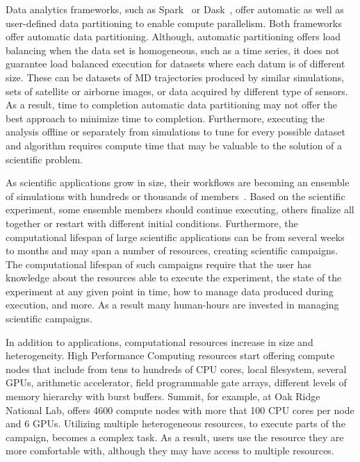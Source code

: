 Data analytics frameworks, such as Spark~\cite{zaharia2010spark} or Dask~\cite{rocklin2015dask}, offer automatic as well as user-defined data partitioning to enable compute parallelism. Both frameworks offer automatic data partitioning. Although, automatic partitioning offers load balancing when the data set is homogeneous, such as a time series, it does not guarantee load balanced execution for datasets where each datum is of different size. These can be datasets of MD trajectories produced by similar simulations, sets of satellite or airborne images, or data acquired by different type of sensors. As a result, time to completion automatic data partitioning may not offer the best approach to minimize time to completion. Furthermore, executing the analysis offline or separately from simulations to tune for every possible dataset and algorithm requires compute time that may be valuable to the solution of a scientific problem.

As scientific applications grow in size, their workflows are becoming an ensemble of simulations with hundreds or thousands of members~\cite{malawski2015algorithms,rietmann2012forward}. Based on the scientific experiment, some ensemble members should continue executing, others finalize all together or restart with different initial conditions. Furthermore, the computational lifespan of large scientific applications can be from several weeks to months and may span a number of resources, creating scientific campaigns. The computational lifespan of such campaigns require that the user has knowledge about the resources able to execute the experiment, the state of the experiment at any given point in time, how to manage data produced during execution, and more. As a result many human-hours are invested in managing scientific campaigns.

In addition to applications, computational resources increase in size and heterogeneity. High Performance Computing resources start offering compute nodes that include from tens to hundreds of CPU cores, local filesystem, several GPUs, arithmetic accelerator, field programmable gate arrays, different levels of memory hierarchy with burst buffers. Summit, for example, at Oak Ridge National Lab, offers 4600 compute nodes with more that 100 CPU cores per node and 6 GPUs. Utilizing multiple heterogeneous resources, to execute parts of the campaign, becomes a complex task. As a result, users use the resource they are more comfortable with, although they may have access to multiple resources.

